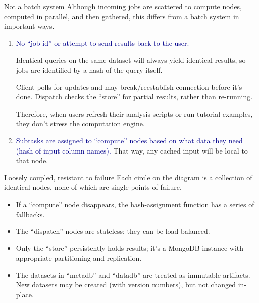\documentclass{beamer}
\begin{document}
\begin{frame}{Not a batch system}
\vspace{0.5 cm}
Although incoming jobs are scattered to compute nodes, computed in parallel, and then gathered, this differs from a batch system in important ways.

\begin{enumerate}
\item \textcolor{darkblue}{No ``job id'' or attempt to send results back to the user.}

\vspace{0.1 cm}
Identical queries on the same dataset will always yield identical results, so jobs are identified by a hash of the query itself.

\vspace{0.1 cm}
Client polls for updates and may break/reestablish connection before it's done. Dispatch checks the ``store'' for partial results, rather than re-running.

\vspace{0.1 cm}
Therefore, when users refresh their analysis scripts or run tutorial examples, they don't stress the computation engine.

\item \textcolor{darkblue}{Subtasks are assigned to ``compute'' nodes based on what data they need (hash of input column names).} That way, any cached input will be local to that node.
\end{enumerate}
\end{frame}

\begin{frame}{Loosely coupled, resistant to failure}
Each circle on the diagram is a collection of identical nodes, none of which are single points of failure.

\begin{itemize}
\item If a ``compute'' node disappears, the hash-assignment function has a series of fallbacks.
\item The ``dispatch'' nodes are stateless; they can be load-balanced.
\item Only the ``store'' persistently holds results; it's a MongoDB instance with appropriate partitioning and replication.
\item The datasets in ``metadb'' and ``datadb'' are treated as immutable artifacts. New datasets may be created (with version numbers), but not changed in-place.
\end{itemize}
\end{frame}
\end{document}
